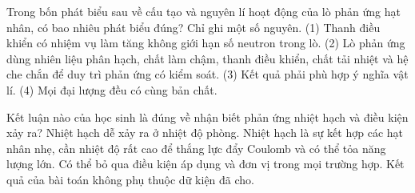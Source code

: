 \begin{ex}
Trong bốn phát biểu sau về cấu tạo và nguyên lí hoạt động của lò phản ứng hạt nhân, có bao nhiêu phát biểu đúng? Chỉ ghi một số nguyên. (1) Thanh điều khiển có nhiệm vụ làm tăng không giới hạn số neutron trong lò. (2) Lò phản ứng dùng nhiên liệu phân hạch, chất làm chậm, thanh điều khiển, chất tải nhiệt và hệ che chắn để duy trì phản ứng có kiểm soát. (3) Kết quả phải phù hợp ý nghĩa vật lí. (4) Mọi đại lượng đều có cùng bản chất.
\end{ex}

\begin{ex}
Kết luận nào của học sinh là đúng về nhận biết phản ứng nhiệt hạch và điều kiện xảy ra?
\choice
{Nhiệt hạch dễ xảy ra ở nhiệt độ phòng.}
{\True Nhiệt hạch là sự kết hợp các hạt nhân nhẹ, cần nhiệt độ rất cao để thắng lực đẩy Coulomb và có thể tỏa năng lượng lớn.}
{Có thể bỏ qua điều kiện áp dụng và đơn vị trong mọi trường hợp.}
{Kết quả của bài toán không phụ thuộc dữ kiện đã cho.}
\end{ex}

